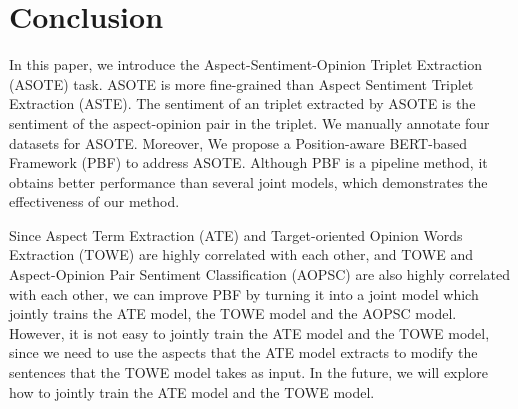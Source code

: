 \documentclass[11pt]{article}
\begin{document}
\section{Conclusion}
In this paper, we introduce the Aspect-Sentiment-Opinion
Triplet Extraction (ASOTE) task. ASOTE is more fine-grained
than Aspect Sentiment Triplet Extraction
(ASTE). The sentiment of an triplet extracted by
ASOTE is the sentiment of the aspect-opinion pair
in the triplet. We manually annotate four datasets
for ASOTE. Moreover, We propose a Position-aware BERT-based Framework (PBF) to address ASOTE. Although PBF is a pipeline method, it obtains better performance than several joint models, which
demonstrates the effectiveness of our method.

 Since Aspect Term Extraction (ATE) and Target-oriented Opinion Words Extraction (TOWE) are highly correlated with each other, and TOWE and Aspect-Opinion Pair Sentiment Classification (AOPSC) are also highly correlated with each other, we can improve PBF by turning it into a joint model which jointly trains the ATE model, the TOWE model and the AOPSC model. However, it is not easy to jointly train the ATE model and the TOWE model, since we need to use the aspects that the ATE model extracts to modify the sentences that the TOWE model takes as input. In the future, we will explore how to jointly train the ATE model and the TOWE model.





\appendix
\end{document}
